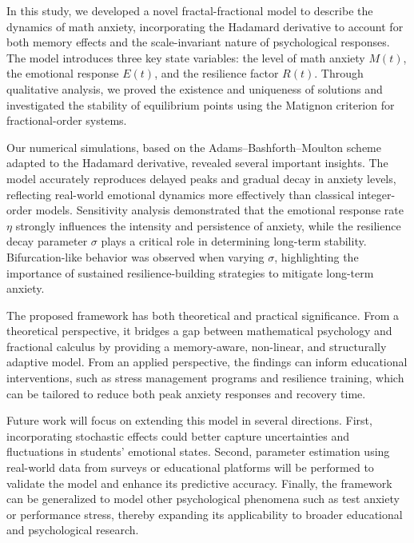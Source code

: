 \documentclass[10pt]{NSP1}
\begin{document}
\par\medskip{}\smallskip

In this study, we developed a novel fractal-fractional model to describe the dynamics of math anxiety, incorporating the Hadamard derivative to account for both memory effects and the scale-invariant nature of psychological responses. The model introduces three key state variables: the level of math anxiety $M(t)$, the emotional response $E(t)$, and the resilience factor $R(t)$. Through qualitative analysis, we proved the existence and uniqueness of solutions and investigated the stability of equilibrium points using the Matignon criterion for fractional-order systems.

Our numerical simulations, based on the Adams–Bashforth–Moulton scheme adapted to the Hadamard derivative, revealed several important insights. The model accurately reproduces delayed peaks and gradual decay in anxiety levels, reflecting real-world emotional dynamics more effectively than classical integer-order models. Sensitivity analysis demonstrated that the emotional response rate $\eta$ strongly influences the intensity and persistence of anxiety, while the resilience decay parameter $\sigma$ plays a critical role in determining long-term stability. Bifurcation-like behavior was observed when varying $\sigma$, highlighting the importance of sustained resilience-building strategies to mitigate long-term anxiety.

The proposed framework has both theoretical and practical significance. From a theoretical perspective, it bridges a gap between mathematical psychology and fractional calculus by providing a memory-aware, non-linear, and structurally adaptive model. From an applied perspective, the findings can inform educational interventions, such as stress management programs and resilience training, which can be tailored to reduce both peak anxiety responses and recovery time.

Future work will focus on extending this model in several directions. First, incorporating stochastic effects could better capture uncertainties and fluctuations in students’ emotional states. Second, parameter estimation using real-world data from surveys or educational platforms will be performed to validate the model and enhance its predictive accuracy. Finally, the framework can be generalized to model other psychological phenomena such as test anxiety or performance stress, thereby expanding its applicability to broader educational and psychological research.
\end{document}
